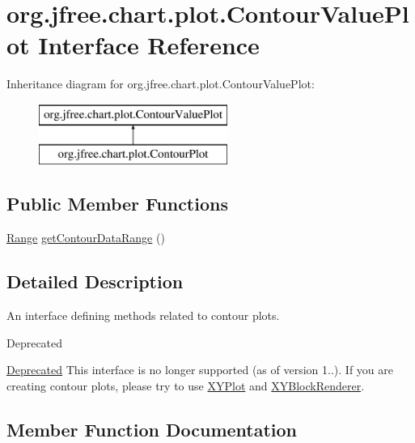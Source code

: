 \hypertarget{interfaceorg_1_1jfree_1_1chart_1_1plot_1_1_contour_value_plot}{}\section{org.\+jfree.\+chart.\+plot.\+Contour\+Value\+Plot Interface Reference}
\label{interfaceorg_1_1jfree_1_1chart_1_1plot_1_1_contour_value_plot}
Inheritance diagram for org.\+jfree.\+chart.\+plot.\+Contour\+Value\+Plot\+:\begin{figure}[H]
\begin{center}
\leavevmode
\includegraphics[height=2.000000cm]{interfaceorg_1_1jfree_1_1chart_1_1plot_1_1_contour_value_plot}
\end{center}
\end{figure}
\subsection*{Public Member Functions}
\begin{DoxyCompactItemize}
\item 
\mbox{\hyperlink{classorg_1_1jfree_1_1data_1_1_range}{Range}} \mbox{\hyperlink{interfaceorg_1_1jfree_1_1chart_1_1plot_1_1_contour_value_plot_a10d08f881ab3a2a7dd3a38bb0f7e267e}{get\+Contour\+Data\+Range}} ()
\end{DoxyCompactItemize}


\subsection{Detailed Description}
An interface defining methods related to contour plots.

\begin{DoxyRefDesc}{Deprecated}
\item[\mbox{\hyperlink{deprecated__deprecated000056}{Deprecated}}]This interface is no longer supported (as of version 1..). If you are creating contour plots, please try to use \mbox{\hyperlink{classorg_1_1jfree_1_1chart_1_1plot_1_1_x_y_plot}{X\+Y\+Plot}} and \mbox{\hyperlink{}{X\+Y\+Block\+Renderer}}. \end{DoxyRefDesc}


\subsection{Member Function Documentation}
\mbox{\label{interfaceorg_1_1jfree_1_1chart_1_1plot_1_1_contour_value_plot_a10d08f881ab3a2a7dd3a38bb0f7e267e}} 
